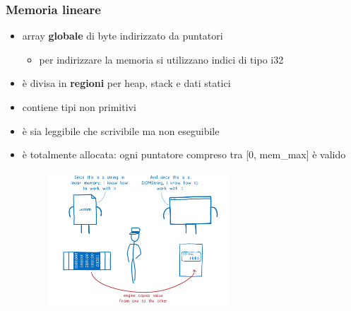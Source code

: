 \documentclass{beamer}
\begin{document}
\begin{frame}
  \frametitle{Memoria lineare}
  \begin{itemize}
    \item array \textbf{globale} di byte indirizzato da puntatori
    \begin{itemize}
      \item per indirizzare la memoria si utilizzano indici di tipo i32
    \end{itemize}
  \item è divisa in \textbf{regioni} per heap, stack e dati statici
    \item contiene tipi non primitivi 
    \item è sia leggibile che scrivibile ma non eseguibile 
    \item è totalmente allocata: ogni puntatore compreso tra [0, mem\_max]
      è valido 
  \end{itemize}

  \centerline{\includegraphics[width=10cm,height=5cm,keepaspectratio]{images/memman.png}}
\end{frame}
\end{document}
